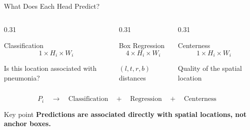 \documentclass[aspectratio=169,11pt]{beamer}
\begin{document}
\begin{frame}{What Does Each Head Predict?}

\begin{columns}[t]

\begin{column}{0.31\textwidth}

\begin{block}{Classification}
\centering
\[
1 \times H_i \times W_i
\]

\vspace{0.1cm}

\footnotesize
Is this location associated with pneumonia?
\end{block}

\end{column}

\begin{column}{0.31\textwidth}

\begin{block}{Box Regression}
\centering
\[
4 \times H_i \times W_i
\]

\vspace{0.1cm}

\footnotesize
$(l,t,r,b)$ distances
\end{block}

\end{column}

\begin{column}{0.31\textwidth}

\begin{block}{Centerness}
\centering
\[
1 \times H_i \times W_i
\]

\vspace{0.1cm}

\footnotesize
Quality of the spatial location
\end{block}

\end{column}

\end{columns}

\vspace{0.5cm}

\centering

\[
P_i
\quad\longrightarrow\quad
\boxed{\text{Classification}}
\quad+\quad
\boxed{\text{Regression}}
\quad+\quad
\boxed{\text{Centerness}}
\]

\vspace{0.25cm}

\begin{block}{Key point}
\centering
\textbf{Predictions are associated directly with spatial locations,
not anchor boxes.}
\end{block}

\end{frame}
\end{document}
